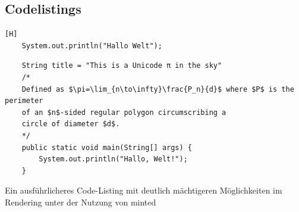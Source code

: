 \subsection{Codelistings}

\begin{lstlisting}[caption=Sehr simples lstlisting, label=sysout, captionpos=b][H]
    System.out.println("Hallo Welt");
\end{lstlisting}

\begin{listing}[H]
    \begin{verbatim}
    String title = "This is a Unicode π in the sky"
    /*
    Defined as $\pi=\lim_{n\to\infty}\frac{P_n}{d}$ where $P$ is the perimeter
    of an $n$-sided regular polygon circumscribing a
    circle of diameter $d$.
    */
    public static void main(String[] args) {
        System.out.println("Hallo, Welt!");
    }
    \end{verbatim}
    \caption{Ein ausführlicheres Code-Listing mit deutlich mächtigeren Möglichkeiten im Rendering unter der Nutzung von minted}
    \label{code:test}
\end{listing}
